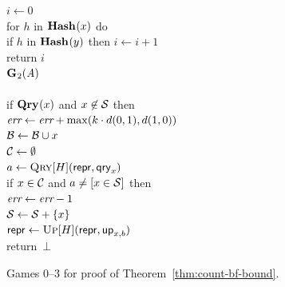\begin{figure}
{      $i \gets 0$\\
      for $h$ in $\mathbf{Hash}\hspace{0.5pt}(x)$ do\\
      \tab if $h$ in $\mathbf{Hash}\hspace{0.5pt}(y)$ then $i \gets i+1$\\
      return $i$
    \\[6pt]
    \underline{$\mathbf{G}\hspace{0.5pt}_2(\mathit{A})$}\\[2pt]
    \\
      if $\mathbf{Qry}\hspace{0.5pt}(x)$ and $x \not\in \mathcal{S}$ then\\
      \tab $\textit{err} \gets \textit{err} + \max(k \cdot d(0,1), d(1,0))$\\
      $\mathcal{B} \gets \mathcal{B} \cup x$\\
      $\mathcal{C} \gets \emptyset$\\
      $a \gets \textsc{Qry}[H](\mathsf{repr}, \mathsf{qry}_x)$\\
      if $x \in \mathcal{C}$ and $a \neq [x \in \mathcal{S}]$ then\\
      \tab $\textit{err} \gets \textit{err}-1$\\
      $\mathcal{S} \gets \mathcal{S} + \{x\}$\\
      $\mathsf{repr} \gets \textsc{Up}[H](\mathsf{repr},\mathsf{up}_{x,b})$\\
      return~$\bot$
  }
  {
  }
  {
  }
  \caption{Games 0--3 for proof of Theorem~\ref{thm:count-bf-bound}.}
  \label{fig:count-bf-bound}
\end{figure}

